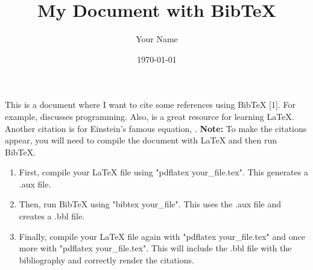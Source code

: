 \documentclass{article}
\title{My Document with BibTeX}
\author{Your Name}
\date{\today}
\begin{document}
\maketitle

This is a document where I want to cite some references using BibTeX [1].
For example, \cite{knuthwebsite} discusses programming.
Also, \cite{latexcompanion} is a great resource for learning LaTeX.
Another citation is for Einstein's famous equation, \cite{einstein}.
\textbf{Note:} To make the citations appear, you will need to compile the document with LaTeX and then run BibTeX.
\begin{enumerate}
    \item First, compile your LaTeX file using "pdflatex your\_file.tex". This generates a .aux file.
    \item Then, run BibTeX using "bibtex your\_file". This uses the .aux file and creates a .bbl file.
    \item Finally, compile your LaTeX file again with "pdflatex your\_file.tex" and once more with "pdflatex your\_file.tex". This will include the .bbl file with the bibliography and correctly render the citations.
\end{enumerate}

\end{document}
